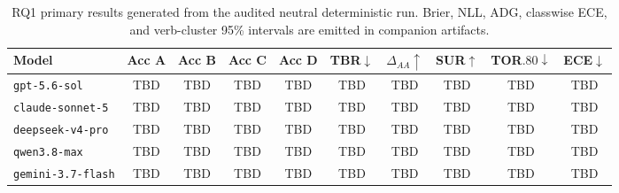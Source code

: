 \begin{table}[t]
\centering
\scriptsize
\begin{tabular}{@{}lccccccccc@{}}
\toprule
Model & Acc A & Acc B & Acc C & Acc D & TBR$\downarrow$ & $\Delta_{AA}\uparrow$ & SUR$\uparrow$ & TOR$.80\downarrow$ & ECE$\downarrow$ \\
\midrule
\texttt{gpt-5.6-sol} & TBD & TBD & TBD & TBD & TBD & TBD & TBD & TBD & TBD \\
\texttt{claude-sonnet-5} & TBD & TBD & TBD & TBD & TBD & TBD & TBD & TBD & TBD \\
\texttt{deepseek-v4-pro} & TBD & TBD & TBD & TBD & TBD & TBD & TBD & TBD & TBD \\
\texttt{qwen3.8-max} & TBD & TBD & TBD & TBD & TBD & TBD & TBD & TBD & TBD \\
\texttt{gemini-3.7-flash} & TBD & TBD & TBD & TBD & TBD & TBD & TBD & TBD & TBD \\
\bottomrule
\end{tabular}
\caption{RQ1 primary results generated from the audited neutral deterministic run. Brier, NLL, ADG, classwise ECE, and verb-cluster 95\% intervals are emitted in companion artifacts.}
\label{tab:rq1}
\end{table}
